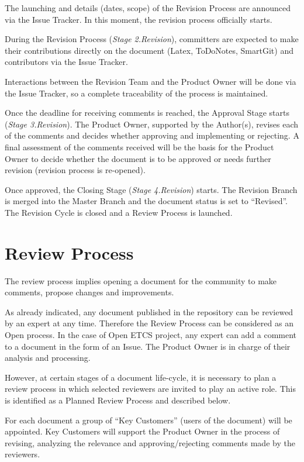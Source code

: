 \documentclass{template/openetcs_article}
\begin{document}
The launching and details (dates, scope) of the Revision Process are announced via the Issue Tracker. In this moment, the revision process officially starts.

During the Revision Process ({\it Stage 2.Revision}), committers are expected to make their contributions directly on the document (Latex, ToDoNotes, SmartGit) and contributors via the Issue Tracker.

Interactions between the Revision Team and the Product Owner will be done via the Issue Tracker, so a complete traceability of the process is maintained.

Once the deadline for receiving comments is reached, the Approval Stage starts ({\it Stage 3.Revision}). The Product Owner, supported by the Author(s), revises each of the comments and decides whether approving and implementing or rejecting. 
A final assessment of the comments received will be the basis for the Product Owner to decide whether the document is to be approved or needs further revision (revision process is re-opened).

Once approved, the Closing Stage ({\it Stage 4.Revision}) starts. The Revision Branch is merged into the Master Branch and the document status is set to “Revised”. The Revision Cycle is closed and a Review Process is launched.

\section{Review Process}
The review process implies opening a document for the community to make comments, propose changes and improvements.

As already indicated, any document published in the repository can be reviewed by an expert at any time. Therefore the Review Process can be considered as an Open process. In the case of Open ETCS project, any expert can add a comment to a document in the form of an Issue. The Product Owner is in charge of their analysis and processing.

However, at certain stages of a document life-cycle, it is necessary to plan a review process in which selected reviewers are invited to play an active role. This is identified as a Planned Review Process and described below.

For each document a group of “Key Customers” (users of the document) will be appointed. Key Customers will support the Product Owner in the process of revising, analyzing the relevance and approving/rejecting comments made by the reviewers. 
\end{document}
